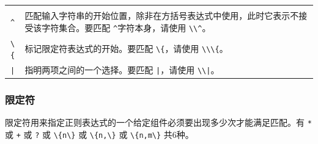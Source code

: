 \documentclass[doctor,openright,twoside]{sjtuthesis}
\newcommand{\passthrough}[1]{#1}
\theoremstyle{plain}
\theoremstyle{definition}
\theoremstyle{remark}
\theoremstyle{ocrenumbox}
\theoremstyle{plain}
\begin{document}
\begin{longtable}[]{@{}cl@{}}
\begin{minipage}[t]{0.72\columnwidth}
\end{minipage}\tabularnewline
\begin{minipage}[t]{0.23\columnwidth}\centering
\passthrough{\lstinline!^!}\strut
\end{minipage} & \begin{minipage}[t]{0.72\columnwidth}\raggedright
匹配输入字符串的开始位置，除非在方括号表达式中使用，此时它表示不接受该字符集合。要匹配 \passthrough{\lstinline!^!}字符本身，请使用 \passthrough{\lstinline!\\^!}。\strut
\end{minipage}\tabularnewline
\begin{minipage}[t]{0.23\columnwidth}\centering
\passthrough{\lstinline!\{!}\strut
\end{minipage} & \begin{minipage}[t]{0.72\columnwidth}\raggedright
标记限定符表达式的开始。要匹配 \passthrough{\lstinline!\{!}，请使用 \passthrough{\lstinline!\\\{!}。\strut
\end{minipage}\tabularnewline
\begin{minipage}[t]{0.23\columnwidth}\centering
\passthrough{\lstinline!|!}\strut
\end{minipage} & \begin{minipage}[t]{0.72\columnwidth}\raggedright
指明两项之间的一个选择。要匹配 \passthrough{\lstinline!|!}，请使用 \passthrough{\lstinline!\\|!}。\strut
\end{minipage}\tabularnewline
\bottomrule
\end{longtable}

\hypertarget{section-88}{%
\subsubsection{限定符}\label{section-88}}

限定符用来指定正则表达式的一个给定组件必须要出现多少次才能满足匹配。有 \passthrough{\lstinline!*!} 或 \passthrough{\lstinline!+!} 或 \passthrough{\lstinline!?!} 或 \passthrough{\lstinline!\{n\}!} 或 \passthrough{\lstinline!\{n,\}!} 或 \passthrough{\lstinline!\{n,m\}!} 共6种。
\end{document}

